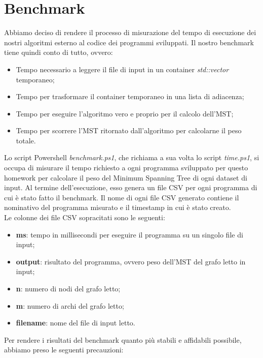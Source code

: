 \section{Benchmark}
\label{cap:benchmark-process}

Abbiamo deciso di rendere il processo di misurazione del tempo di esecuzione dei nostri algoritmi esterno al codice dei programmi sviluppati.
Il nostro benchmark tiene quindi conto di tutto, ovvero:

\begin{itemize}
    \item Tempo necessario a leggere il file di input in un container \textit{std::vector} temporaneo;
    \item Tempo per trasformare il container temporaneo in una lista di adiacenza;
    \item Tempo per eseguire l'algoritmo vero e proprio per il calcolo dell'MST;
    \item Tempo per scorrere l'MST ritornato dall'algoritmo per calcolarne il peso totale.
\end{itemize}

\noindent Lo script Powershell \textit{benchmark.ps1}, che richiama a sua volta lo script \textit{time.ps1}, si occupa di misurare il tempo richiesto a ogni programma sviluppato per questo homework per calcolare il peso del Minimum Spanning Tree di ogni dataset di input. Al termine dell'esecuzione, esso genera un file CSV per ogni programma di cui è stato fatto il benchmark. Il nome di ogni file CSV generato contiene il nominativo del programma misurato e il timestamp in cui è stato creato. \\

\noindent Le colonne dei file CSV sopracitati sono le seguenti:

\begin{itemize}
    \item \textbf{ms}: tempo in millisecondi per eseguire il programma su un singolo file di input;
    \item \textbf{output}: risultato del programma, ovvero peso dell'MST del grafo letto in input;
    \item \textbf{n}: numero di nodi del grafo letto;
    \item \textbf{m}: numero di archi del grafo letto;
    \item \textbf{filename}: nome del file di input letto.
\end{itemize}

\noindent Per rendere i risultati del benchmark quanto più stabili e affidabili possibile, abbiamo preso le seguenti precauzioni:

